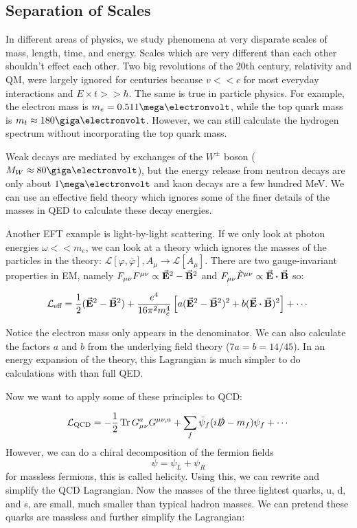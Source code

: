 \documentclass[a4paper,twoside,master.tex]{subfiles}
\begin{document}
\subsection{Separation of Scales}
\label{sub:separation_of_scales}

In different areas of physics, we study phenomena at very disparate scales of mass, length, time, and energy. Scales which are very different than each other shouldn't effect each other. Two big revolutions of the 20th century, relativity and QM, were largely ignored for centuries because $ v << c $ for most everyday interactions and $ E \times t >> \hbar $. The same is true in particle physics. For example, the electron mass is $ m_e = 0.511\mega\electronvolt $, while the top quark mass is $ m_t \approx 180\giga\electronvolt $. However, we can still calculate the hydrogen spectrum without incorporating the top quark mass.

Weak decays are mediated by exchanges of the $ W^{\pm} $ boson ($ M_W \approx 80\giga\electronvolt $), but the energy release from neutron decays are only about $ 1\mega\electronvolt $ and kaon decays are a few hundred MeV. We can use an effective field theory which ignores some of the finer details of the masses in QED to calculate these decay energies.

Another EFT example is light-by-light scattering. If we only look at photon energies $ \omega << m_e $, we can look at a theory which ignores the masses of the particles in the theory: $ \mathcal{L}[\varphi, \bar{\varphi}], A_{\mu} \to \mathcal{L}[A_{\mu}] $. There are two gauge-invariant properties in EM, namely $ F_{\mu \nu} F^{\mu \nu} \propto \va{E}^2 - \va{B}^2 $ and $ F_{\mu \nu} \tilde{F}^{\mu \nu} \propto \va{E} \vdot \va{B} $ so:

\begin{equation}
    \mathcal{L}_{\text{eff}} = \frac{1}{2} (\va{E}^2 - \va{B}^2) + \frac{e^4}{16 \pi^2 m_e^4} \left[ a(\va{E}^2 - \va{B}^2)^2 + b (\va{E} \vdot \va{B})^2 \right] + \cdots
\end{equation}

Notice the electron mass only appears in the denominator. We can also calculate the factors $ a $ and $ b $ from the underlying field theory ($ 7a = b = 14/45 $). In an energy expansion of the theory, this Lagrangian is much simpler to do calculations with than full QED.

Now we want to apply some of these principles to QCD:

\begin{equation}
    \mathcal{L}_{\text{QCD}} = - \frac{1}{2} \Tr G^a_{\mu \nu} G^{\mu \nu, a} + \sum_f \bar{\psi}_f (\imath \slashed{D} - m_f) \psi_f + \cdots
\end{equation}
However, we can do a chiral decomposition of the fermion fields
\begin{equation}
    \psi = \psi_L + \psi_R
\end{equation}
for massless fermions, this is called helicity. Using this, we can rewrite and simplify the QCD Lagrangian. Now the masses of the three lightest quarks, u, d, and s, are small, much smaller than typical hadron masses. We can pretend these quarks are massless and further simplify the Lagrangian:
\end{document}
